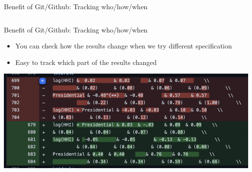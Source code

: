 \documentclass[handout,pdftex,10pt,aspectratio=169]{beamer}
\begin{document}
\begin{frame}{Benefit of Git/Github: Tracking who/how/when}
\begin{columns}
\begin{column}{0.53\linewidth}
  \end{column}
  \end{columns}
\end{frame}

\begin{frame}{Benefit of Git/Github: Tracking who/how/when}
  \begin{itemize}[<+->]\setlength\itemsep{-3pt}
    \item You can check how the results change when we try different specification
    \item Easy to track which part of the results changed 
  \end{itemize}
  \vspace{10pt}
  \centering
  \includegraphics[width = 0.7\linewidth]{github_regression.png}
\end{frame}
\end{document}
